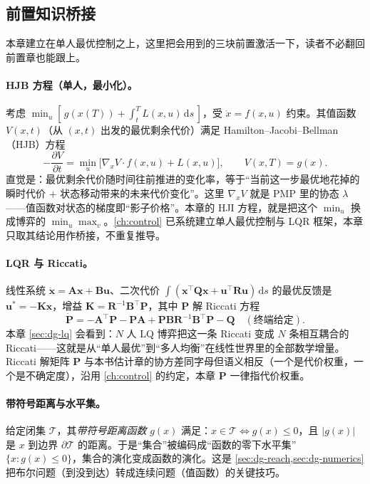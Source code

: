 \subsection*{前置知识桥接}
\label{sec:dg-bridge}
本章建立在单人最优控制之上，这里把会用到的三块前置激活一下，读者不必翻回前置章也能跟上。

\paragraph{HJB 方程（单人，最小化）。}
考虑 $\min_u[\,g(x(T))+\int_t^T L(x,u)\,\mathrm ds\,]$，受 $\dot x=f(x,u)$ 约束。其值函数 $V(x,t)$（从 $(x,t)$ 出发的最优剩余代价）满足 Hamilton--Jacobi--Bellman（HJB）方程
\begin{equation}
  -\frac{\partial V}{\partial t}=\min_{u}\Big[\nabla_x V\cdot f(x,u)+L(x,u)\Big],\qquad V(x,T)=g(x).
  \label{eq:dg-hjb}
\end{equation}
直觉是：最优剩余代价随时间往前推进的变化率，等于“当前这一步最优地花掉的瞬时代价 + 状态移动带来的未来代价变化”。这里 $\nabla_x V$ 就是 PMP 里的协态 $\lambda$——值函数对状态的梯度即“影子价格”。本章的 HJI 方程，就是把这个 $\min_u$ 换成博弈的 $\min_u\max_v$。\cref{ch:control} 已系统建立单人最优控制与 LQR 框架，本章只取其结论用作桥接，不重复推导。

\paragraph{LQR 与 Riccati。}
线性系统 $\dot{\mathbf x}=\mathbf A\mathbf x+\mathbf B\mathbf u$、二次代价 $\int(\mathbf x^\top\mathbf Q\mathbf x+\mathbf u^\top\mathbf R\mathbf u)\,\mathrm ds$ 的最优反馈是 $\mathbf u^*=-\mathbf K\mathbf x$，增益 $\mathbf K=\mathbf R^{-1}\mathbf B^\top\mathbf P$，其中 $\mathbf P$ 解 Riccati 方程
\begin{equation}
  \dot{\mathbf P}=-\mathbf A^\top\mathbf P-\mathbf P\mathbf A+\mathbf P\mathbf B\mathbf R^{-1}\mathbf B^\top\mathbf P-\mathbf Q\quad(\text{终端给定}).
  \label{eq:dg-riccati}
\end{equation}
本章 \cref{sec:dg-lq} 会看到：$N$ 人 LQ 博弈把这一条 Riccati 变成 $N$ 条相互耦合的 Riccati——这就是从“单人最优”到“多人均衡”在线性世界里的全部数学增量。Riccati 解矩阵 $\mathbf P$ 与本书估计章的协方差同字母但语义相反（一个是代价权重，一个是不确定度），沿用 \cref{ch:control} 的约定，本章 $\mathbf P$ 一律指代价权重。

\paragraph{带符号距离与水平集。}
给定闭集 $\mathcal{T}$，其\emph{带符号距离函数} $g(x)$ 满足：$x\in\mathcal{T}\Leftrightarrow g(x)\le 0$，且 $|g(x)|$ 是 $x$ 到边界 $\partial\mathcal{T}$ 的距离。于是“集合”被编码成“函数的零下水平集” $\{x:g(x)\le 0\}$，集合的演化变成函数的演化。这是 \cref{sec:dg-reach,sec:dg-numerics} 把布尔问题（到没到达）转成连续问题（值函数）的关键技巧。

